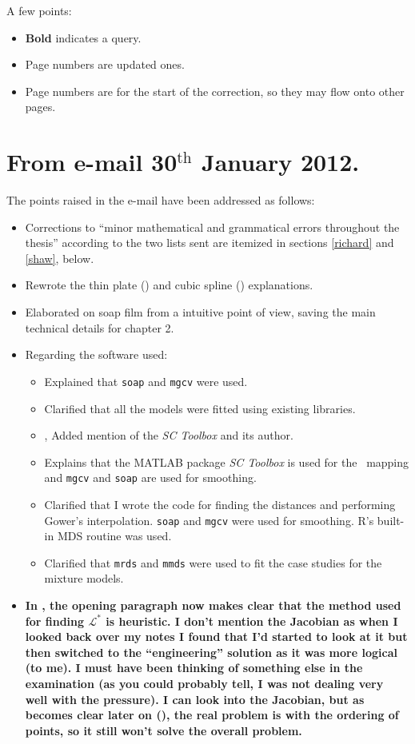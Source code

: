 
A few points:
\begin{itemize}
	\item \textbf{Bold} indicates a query.
	\item Page numbers are updated ones.
	\item Page numbers are for the start of the correction, so they may flow onto other pages.
\end{itemize}


\section{From e-mail 30$^\text{th}$ January 2012.}

The points raised in the e-mail have been addressed as follows:
\begin{itemize}
\item Corrections to ``minor mathematical and grammatical errors throughout the thesis'' according to the two lists sent are itemized in sections \ref{richard} and \ref{shaw}, below.
\item Rewrote the thin plate () and cubic spline () explanations.
\item {} Elaborated on soap film from a intuitive point of view, saving the main technical details for chapter 2.
\item Regarding the software used:
\begin{itemize}
	\item {} Explained that \texttt{soap} and \texttt{mgcv} were used.
	\item {} Clarified that all the models were fitted using existing libraries.
	\item {},  Added mention of the \textit{SC Toolbox} and its author.
	\item {} Explains that the MATLAB package \textit{SC Toolbox} is used for the \sch\ mapping and \texttt{mgcv} and \texttt{soap} are used for smoothing.
	\item {} Clarified that I wrote the code for finding the distances and performing Gower's interpolation. \texttt{soap} and \texttt{mgcv} were used for smoothing. \textsf{R}'s built-in MDS routine was used.
	\item {} Clarified that \texttt{mrds} and \texttt{mmds} were used to fit the case studies for the mixture models.
\end{itemize}
\item \textbf{In , the opening paragraph now makes clear that the method used for finding $\mathcal{L}^*$ is heuristic. I don't mention the Jacobian as when I looked back over my notes I found that I'd started to look at it but then switched to the ``engineering'' solution as it was more logical (to me). I must have been thinking of something else in the examination (as you could probably tell, I was not dealing very well with the pressure). I can look into the Jacobian, but as becomes clear later on (), the real problem is with the ordering of points, so it still won't solve the overall problem.}

\end{itemize}
